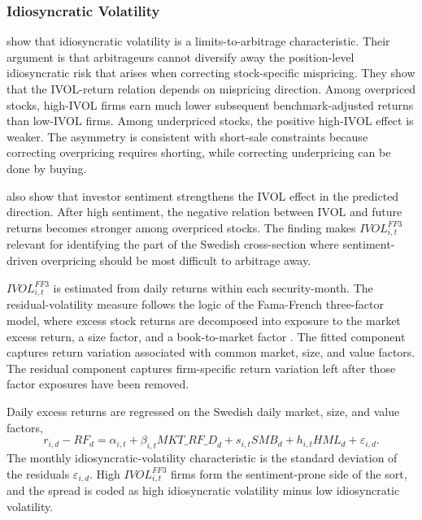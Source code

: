 \documentclass[11pt]{article}
\newcommand{\var}[1]{\ensuremath{#1}}
\begin{document}
\subsubsection{Idiosyncratic Volatility}
\citet{stambaugh2015ivol} show that idiosyncratic volatility is a limits-to-arbitrage characteristic. Their argument is that arbitrageurs cannot diversify away the position-level idiosyncratic risk that arises when correcting stock-specific mispricing. They show that the IVOL-return relation depends on mispricing direction. Among overpriced stocks, high-IVOL firms earn much lower subsequent benchmark-adjusted returns than low-IVOL firms. Among underpriced stocks, the positive high-IVOL effect is weaker. The asymmetry is consistent with short-sale constraints because correcting overpricing requires shorting, while correcting underpricing can be done by buying.

\citet{stambaugh2015ivol} also show that investor sentiment strengthens the IVOL effect in the predicted direction. After high sentiment, the negative relation between IVOL and future returns becomes stronger among overpriced stocks. The finding makes \var{IVOL^{FF3}_{i,t}} relevant for identifying the part of the Swedish cross-section where sentiment-driven overpricing should be most difficult to arbitrage away.

\var{IVOL^{FF3}_{i,t}} is estimated from daily returns within each security-month. The residual-volatility measure follows the logic of the Fama-French three-factor model, where excess stock returns are decomposed into exposure to the market excess return, a size factor, and a book-to-market factor \citep{fama1993common}. The fitted component captures return variation associated with common market, size, and value factors. The residual component captures firm-specific return variation left after those factor exposures have been removed.

Daily excess returns are regressed on the Swedish daily market, size, and value factors,
\begin{equation}
    r_{i,d} - RF_d
    =
    \alpha_{i,t}
    + \beta_{i,t} \var{MKT\_RF\_D}_d
    + s_{i,t} \var{SMB}_d
    + h_{i,t} \var{HML}_d
    + \varepsilon_{i,d}.
\end{equation}
The monthly idiosyncratic-volatility characteristic is the standard deviation of the residuals \var{\varepsilon_{i,d}}. High \var{IVOL^{FF3}_{i,t}} firms form the sentiment-prone side of the sort, and the spread is coded as high idiosyncratic volatility minus low idiosyncratic volatility.
\end{document}
